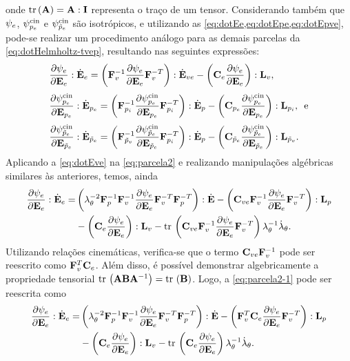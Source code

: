 \documentclass[Tese.tex]{subfiles}
\begin{document}
onde $\text{tr}\,(\mathbf{A}) = \mathbf{A}:\mathbf{I}$ representa o traço de um tensor. Considerando também que $\psi_e$, $\psi_{p_e}^\text{cin}$ e $\psi_{\tilde{p}_e}^\text{cin}$ são isotrópicos, e utilizando as \cref{eq:dotEe,eq:dotEpe,eq:dotEpve}, pode-se realizar um procedimento análogo para as demais parcelas da \cref{eq:dotHelmholtz-tvep}, resultando nas seguintes expressões:
\begin{align}
& \dfrac{\partial \psi_e}{\partial \mathbf{E}_e}:\dot{\mathbf{E}}_e = \left(\mathbf{F}_v^{-1}\dfrac{\partial \psi_e}{\partial \mathbf{E}_e}\mathbf{F}_v^{-T}\right):\dot{\mathbf{E}}_{ve} - \left(\mathbf{C}_e\dfrac{\partial \psi_e}{\partial \mathbf{E}_e}\right):\mathbf{L}_v, \label{eq:parcela2} \\[0.1cm]
& \dfrac{\partial \psi_{p_e}^\text{cin}}{\partial \mathbf{E}_{p_e}}:\dot{\mathbf{E}}_{p_e} = \left(\mathbf{F}_{p_i}^{-1}\dfrac{\partial \psi_{p_e}^\text{cin}}{\partial \mathbf{E}_{p_e}}\mathbf{F}_{p_i}^{-T}\right):\dot{\mathbf{E}}_p - \left(\mathbf{C}_{p_e}\dfrac{\partial \psi_{p_e}^\text{cin}}{\partial \mathbf{E}_{p_e}}\right):\mathbf{L}_{p_i}, \text{\, e} \label{eq:parcela3}\\[0.1cm]
& \dfrac{\partial \psi_{\tilde{p}_e}^\text{cin}}{\partial \mathbf{E}_{\tilde{p}_e}}:\dot{\mathbf{E}}_{\tilde{p}_e} = \left(\mathbf{F}_{\tilde{p}_v}^{-1}\dfrac{\partial \psi_{\tilde{p}_e}^\text{cin}}{\partial \mathbf{E}_{\tilde{p}_e}}\mathbf{F}_{p_i}^{-T}\right):\dot{\mathbf{E}}_p - \left(\mathbf{C}_{\tilde{p}_e}\dfrac{\partial \psi_{\tilde{p}_e}^\text{cin}}{\partial \mathbf{E}_{\tilde{p}_e}}\right):\mathbf{L}_{\tilde{p}_v}. \label{eq:parcela4}
\end{align}
Aplicando a \cref{eq:dotEve} na \cref{eq:parcela2} e realizando manipulações algébricas similares às anteriores, temos, ainda
\begin{equation}
\begin{aligned}\label{eq:parcela2-1}
\dfrac{\partial \psi_e}{\partial \mathbf{E}_e}:\dot{\mathbf{E}}_e = & \left(\lambda_{\theta}^{-2}\mathbf{F}_p^{-1}\mathbf{F}_v^{-1}\dfrac{\partial \psi_e}{\partial \mathbf{E}_e}\mathbf{F}_v^{-T}\mathbf{F}_p^{-T}\right):\dot{\mathbf{E}} - \left(\mathbf{C}_{ve}\mathbf{F}_v^{-1}\dfrac{\partial \psi_e}{\partial \mathbf{E}_e}\mathbf{F}_v^{-T}\right):\mathbf{L}_p\\ &- \left(\mathbf{C}_e\dfrac{\partial \psi_e}{\partial \mathbf{E}_e}\right):\mathbf{L}_v - \text{tr}\,\left(\mathbf{C}_{ve}\mathbf{F}_v^{-1}\dfrac{\partial \psi_e}{\partial \mathbf{E}_e}\mathbf{F}_v^{-T}\right)\lambda_{\theta}^{-1}\dot{\lambda}_{\theta}.
\end{aligned}
\end{equation}
Utilizando relações cinemáticas, verifica-se que o termo $\mathbf{C}_{ve}\mathbf{F}_v^{-1}$ pode ser reescrito como $\mathbf{F}_v^T\mathbf{C}_e$. Além disso, é possível demonstrar algebricamente a propriedade tensorial $\text{tr}\,\left(\mathbf{A}\mathbf{B}\mathbf{A}^{-1}\right) = \text{tr}\,\left(\mathbf{B}\right)$. Logo, a \cref{eq:parcela2-1} pode ser reescrita como
\begin{equation}
	\begin{aligned}\label{eq:parcela2-2}
		\dfrac{\partial \psi_e}{\partial \mathbf{E}_e}:\dot{\mathbf{E}}_e = & \left(\lambda_{\theta}^{-2}\mathbf{F}_p^{-1}\mathbf{F}_v^{-1}\dfrac{\partial \psi_e}{\partial \mathbf{E}_e}\mathbf{F}_v^{-T}\mathbf{F}_p^{-T}\right):\dot{\mathbf{E}} - \left(\mathbf{F}_v^{T}\mathbf{C}_e\dfrac{\partial \psi_e}{\partial \mathbf{E}_e}\mathbf{F}_v^{-T}\right):\mathbf{L}_p\\ &- \left(\mathbf{C}_e\dfrac{\partial \psi_e}{\partial \mathbf{E}_e}\right):\mathbf{L}_v - \text{tr}\,\left(\mathbf{C}_e\dfrac{\partial \psi_e}{\partial \mathbf{E}_e}\right)\lambda_{\theta}^{-1}\dot{\lambda}_{\theta}.
	\end{aligned}
\end{equation}
\end{document}

